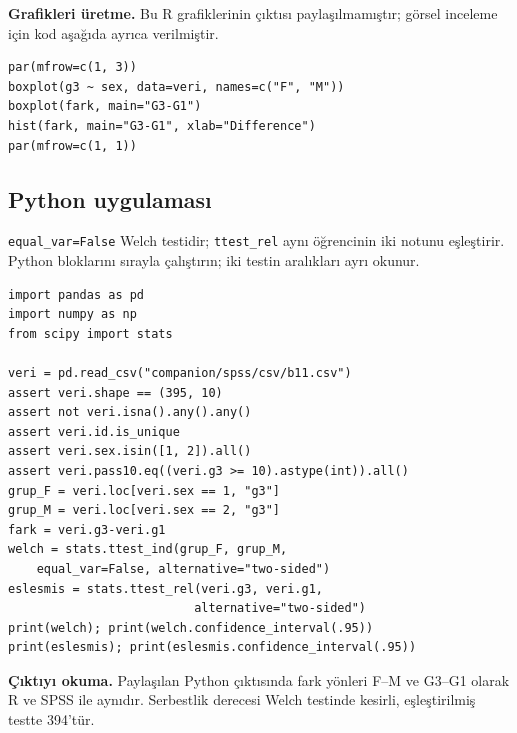 \par\noindent\begin{minipage}{\linewidth}
\textbf{Grafikleri üretme.} Bu R grafiklerinin çıktısı paylaşılmamıştır;
görsel inceleme için kod aşağıda ayrıca verilmiştir.

\begin{lstlisting}[style=prismR]
par(mfrow=c(1, 3))
boxplot(g3 ~ sex, data=veri, names=c("F", "M"))
boxplot(fark, main="G3-G1")
hist(fark, main="G3-G1", xlab="Difference")
par(mfrow=c(1, 1))
\end{lstlisting}

\end{minipage}\par

\par\noindent\begin{minipage}{\linewidth}
\subsection{Python uygulaması}
\label{sec:python-b11}

\texttt{equal\_var=False} Welch testidir; \texttt{ttest\_rel} aynı
öğrencinin iki notunu eşleştirir. Python bloklarını sırayla çalıştırın;
iki testin aralıkları ayrı okunur.

\begin{lstlisting}[style=prismPythonApp]
import pandas as pd
import numpy as np
from scipy import stats

veri = pd.read_csv("companion/spss/csv/b11.csv")
assert veri.shape == (395, 10)
assert not veri.isna().any().any()
assert veri.id.is_unique
assert veri.sex.isin([1, 2]).all()
assert veri.pass10.eq((veri.g3 >= 10).astype(int)).all()
grup_F = veri.loc[veri.sex == 1, "g3"]
grup_M = veri.loc[veri.sex == 2, "g3"]
fark = veri.g3-veri.g1
welch = stats.ttest_ind(grup_F, grup_M,
    equal_var=False, alternative="two-sided")
eslesmis = stats.ttest_rel(veri.g3, veri.g1,
                          alternative="two-sided")
print(welch); print(welch.confidence_interval(.95))
print(eslesmis); print(eslesmis.confidence_interval(.95))
\end{lstlisting}

\textbf{Çıktıyı okuma.} Paylaşılan Python çıktısında fark yönleri
F--M ve G3--G1 olarak R ve SPSS ile aynıdır. Serbestlik derecesi
Welch testinde kesirli, eşleştirilmiş testte 394'tür.
\end{minipage}\par

